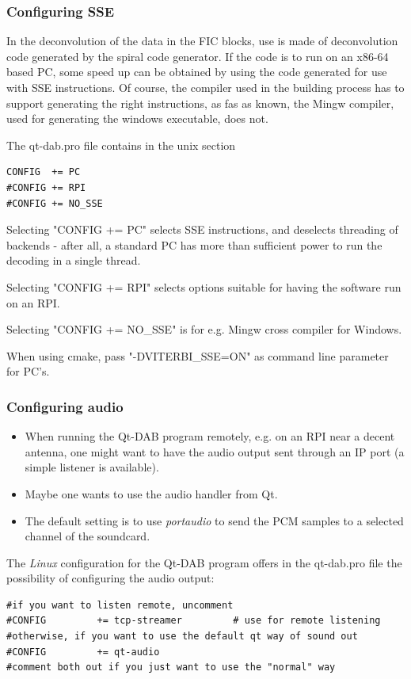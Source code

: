 \documentclass[12pt]{article}
\begin{document}
\subsubsection{Configuring SSE}
In the deconvolution of the data in the FIC blocks, use is made
of deconvolution code generated by the spiral code generator.
If the code is to run on an x86-64 based PC, some speed up can be
obtained by using the code generated for use with SSE instructions.
Of course, the compiler used in the building process
 has to support generating the right
instructions, as fas as known, the Mingw compiler, used for
generating the windows executable, does not.
\par
The qt-dab.pro file contains in the unix section
\begin{verbatim}
CONFIG	+= PC
#CONFIG	+= RPI
#CONFIG	+= NO_SSE
\end{verbatim}
\par
Selecting "CONFIG += PC" selects SSE instructions, and deselects threading
of backends - after all, a standard PC has more than sufficient power to
run the decoding in a single thread.
\par
Selecting "CONFIG += RPI" selects options suitable for having the software
run on an RPI.
\par
Selecting "CONFIG += NO\_SSE" is for e.g. Mingw cross compiler for Windows.
\par
When using cmake, pass "-DVITERBI\_SSE=ON" as command line parameter
for PC's.

\subsubsection{Configuring audio}
\begin{itemize}
\item 
When running the Qt-DAB program remotely, e.g. on an RPI near a decent
antenna, one might want to have the audio output sent through an IP port
(a simple listener is available).
\item
Maybe one wants to use the audio handler from Qt.
\item
The default setting is to use {\em portaudio} to send the PCM samples
to a selected channel of the soundcard.
\end{itemize}
The {\em Linux} configuration for the Qt-DAB program offers in the
qt-dab.pro file the possibility of configuring the audio output:
\begin{verbatim}
#if you want to listen remote, uncomment
#CONFIG         += tcp-streamer         # use for remote listening
#otherwise, if you want to use the default qt way of sound out
#CONFIG         += qt-audio
#comment both out if you just want to use the "normal" way
\end{verbatim}
\end{document}
